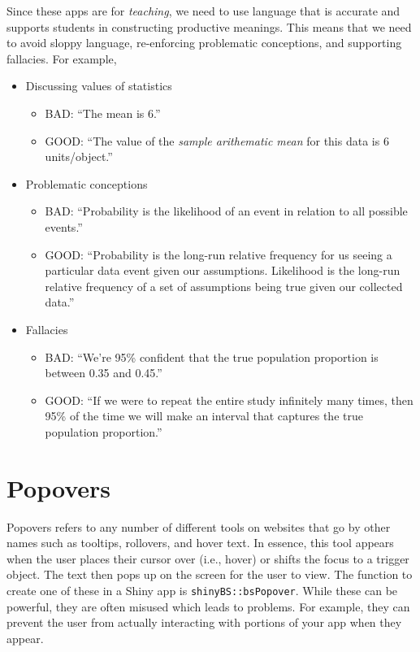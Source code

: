 \documentclass[]{book}
\providecommand{\tightlist}{%
  \setlength{\itemsep}{0pt}\setlength{\parskip}{0pt}}
\begin{document}
Since these apps are for \emph{teaching}, we need to use language that is accurate and supports students in constructing productive meanings. This means that we need to avoid sloppy language, re-enforcing problematic conceptions, and supporting fallacies. For example,

\begin{itemize}
\tightlist
\item
  Discussing values of statistics

  \begin{itemize}
  \tightlist
  \item
    BAD: ``The mean is 6.''
  \item
    GOOD: ``The value of the \emph{sample arithematic mean} for this data is 6 units/object.''
  \end{itemize}
\item
  Problematic conceptions

  \begin{itemize}
  \tightlist
  \item
    BAD: ``Probability is the likelihood of an event in relation to all possible events.''
  \item
    GOOD: ``Probability is the long-run relative frequency for us seeing a particular data event given our assumptions. Likelihood is the long-run relative frequency of a set of assumptions being true given our collected data.''
  \end{itemize}
\item
  Fallacies

  \begin{itemize}
  \tightlist
  \item
    BAD: ``We're 95\% confident that the true population proportion is between 0.35 and 0.45.''
  \item
    GOOD: ``If we were to repeat the entire study infinitely many times, then 95\% of the time we will make an interval that captures the true population proportion.''
  \end{itemize}
\end{itemize}

\hypertarget{popovers}{%
\section{Popovers}\label{popovers}}

Popovers refers to any number of different tools on websites that go by other names such as tooltips, rollovers, and hover text. In essence, this tool appears when the user places their cursor over (i.e., hover) or shifts the focus to a trigger object. The text then pops up on the screen for the user to view. The function to create one of these in a Shiny app is \texttt{shinyBS::bsPopover}. While these can be powerful, they are often misused which leads to problems. For example, they can prevent the user from actually interacting with portions of your app when they appear.
\end{document}

